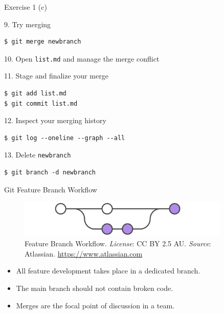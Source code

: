 \documentclass[handout]{beamer}
\begin{document}
\begin{frame}[fragile]{Exercise 1 (c)}



\vspace{0.3cm}

9. Try merging

\begin{lstlisting}
$ git merge newbranch
\end{lstlisting}

10. Open \texttt{list.md} and manage the merge conflict

\vspace{0.3cm}

11. Stage and finalize your merge

\begin{lstlisting}
$ git add list.md
$ git commit list.md
\end{lstlisting}

12. Inspect your merging history

\begin{lstlisting}
$ git log --oneline --graph --all
\end{lstlisting}

13. Delete \texttt{newbranch}

\begin{lstlisting}
$ git branch -d newbranch
\end{lstlisting}

\end{frame}

\begin{frame}{Git Feature Branch Workflow}
\begin{figure}
	\includegraphics[width=0.9\textwidth]{figures/feature_branch.pdf}
	\caption{Feature Branch Workflow. \textit{License}: CC BY 2.5 AU. \textit{Source}: Atlassian. \href{https://www.atlassian.com/git/tutorials/comparing-workflows/feature-branch-workflow}{https://www.atlassian.com}}
\end{figure}
\begin{itemize}
	\item All feature development takes place in a dedicated branch.
	\item The main branch should not contain broken code.
	\item Merges are the focal point of discussion in a team.
\end{itemize}
\end{frame}
\end{document}
